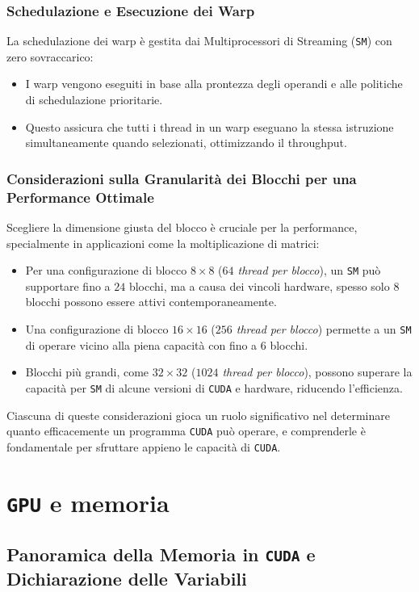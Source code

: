 \subsection{Schedulazione e Esecuzione dei Warp}
La schedulazione dei warp è gestita dai Multiprocessori di Streaming
(\texttt{SM}) con zero sovraccarico:
\begin{itemize}
    \item I warp vengono eseguiti in base alla prontezza degli operandi
    e alle politiche di schedulazione prioritarie.
    \item Questo assicura che tutti i thread in un warp eseguano
    la stessa istruzione simultaneamente quando selezionati, ottimizzando il throughput.
\end{itemize}

\subsection{Considerazioni sulla Granularità dei Blocchi per una
Performance Ottimale}
Scegliere la dimensione giusta del blocco è cruciale per la performance,
specialmente in applicazioni come la moltiplicazione di matrici:
\begin{itemize}
    \item Per una configurazione di blocco $8 \times 8$
    (\textit{$64$ thread per blocco}), un \texttt{SM} può supportare
    fino a $24$ blocchi, ma a causa dei vincoli hardware, spesso solo
    $8$ blocchi possono essere attivi contemporaneamente.
    \item Una configurazione di blocco $16 \times 16$
    (\textit{$256$ thread per blocco}) permette a un \texttt{SM}
    di operare vicino alla piena capacità con fino a $6$ blocchi.
    \item Blocchi più grandi, come $32 \times 32$
    (\textit{$1024$ thread per blocco}), possono superare la
    capacità per \texttt{SM} di alcune versioni di \texttt{CUDA}
    e hardware, riducendo l'efficienza.
\end{itemize}

Ciascuna di queste considerazioni gioca un ruolo significativo nel
determinare quanto efficacemente un programma \texttt{CUDA} può operare,
e comprenderle è fondamentale per sfruttare appieno le capacità di \texttt{CUDA}.

\chapter{\texttt{GPU} e memoria}
\section{Panoramica della Memoria in \texttt{CUDA} e Dichiarazione delle Variabili}

